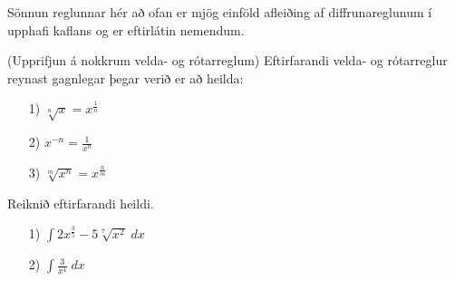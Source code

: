 \begin{ath}
Sönnun reglunnar hér að ofan er mjög einföld afleiðing af diffrunareglunum í upphafi kaflans og er eftirlátin nemendum.
\end{ath}

\begin{regla}{(Upprifjun á nokkrum velda- og rótarreglum)}
Eftirfarandi velda- og rótarreglur reynast gagnlegar þegar verið er að heilda:
\begin{itemize}
\setlength\itemsep{4mm}
\item[1)] $\displaystyle \sqrt[n]{x} = x^{\tfrac{1}{n}}$

\item[2)] $\displaystyle x^{-n} = \frac{1}{x^{n}}$

\item[3)] $\displaystyle \sqrt[m]{x^{n}} = x^{\tfrac{n}{m}}$
\end{itemize}
\end{regla}

\begin{æd}
Reiknið eftirfarandi heildi.
\begin{itemize}
\item[1)] $\displaystyle \int 2x^{\tfrac{3}{5}}-5\sqrt[7]{x^{2}} \; dx$

\item[2)] $\displaystyle \int \frac{3}{x^{4}}\; dx$
\end{itemize}
\end{æd}

